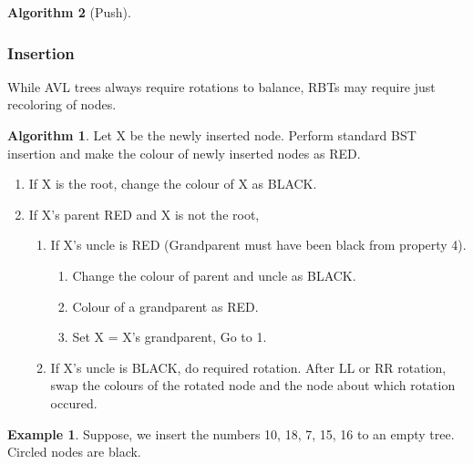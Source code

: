 \documentclass[10pt, a4paper]{extarticle}
\theoremstyle{definition}
\newtheorem{alg}{Algorithm}
\newtheorem{eg}{Example}
\begin{document}
\begin{alg}[Push]
	\subsubsection{Insertion}
	While AVL trees always require rotations to balance, RBTs may require just recoloring of nodes.
	\begin{alg}
			Let X be the newly inserted node.
			Perform standard BST insertion and make the colour of newly inserted nodes as RED.
		\begin{enumerate}
			\item If X is the root, change the colour of X as BLACK.
			\item If X’s parent RED and X is not the root,
				\begin{enumerate}
					\item If X’s uncle is RED (Grandparent must have been black from property 4).
						\begin{enumerate}
							\item Change the colour of parent and uncle as BLACK.
							\item Colour of a grandparent as RED.
							\item Set X = X’s grandparent, Go to 1.
					\end{enumerate}
				\item If X’s uncle is BLACK, do required rotation. After LL or RR rotation, swap the colours of the rotated node and the node about which rotation occured.
			\end{enumerate}
	\end{enumerate}
	\end{alg}
	\begin{eg}
		Suppose, we insert the numbers 10, 18, 7, 15, 16 to an empty tree. Circled nodes are black. 
		\begin{center}

\end{center}
\end{eg}
\end{alg}
\end{document}
